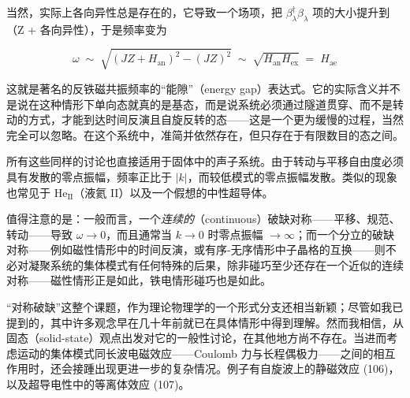 当然，实际上各向异性总是存在的，它导致一个场项，把 $\beta_\lambda^\dagger\beta_\lambda$ 项的大小提升到（Z + 各向异性），于是频率变为

\begin{equation*}
\omega \;\sim\; \sqrt{\left(JZ + H_{\text{an}}\right)^2 - \left(JZ\right)^2} \;\sim\; \sqrt{H_{\text{an}}H_{\text{ex}}} \;=\; H_{\text{ae}}
\end{equation*}

这就是著名的反铁磁共振频率的“能隙”（energy gap）表达式。它的实际含义并不是说在这种情形下单向态就真的是基态，而是说系统必须通过隧道贯穿、而不是转动的方式，才能到达时间反演且自旋反转的态——这是一个更为缓慢的过程，当然完全可以忽略。在这个系统中，准简并依然存在，但只存在于有限数目的态之间。

所有这些同样的讨论也直接适用于固体中的声子系统。由于转动与平移自由度必须具有发散的零点振幅，频率正比于 $|k|$，而较低模式的零点振幅发散。类似的现象也常见于 $\mathrm{He}_{\mathrm{II}}$（液氦 II）以及一个假想的中性超导体。

值得注意的是：一般而言，一个\emph{连续的}（continuous）破缺对称——平移、规范、转动——导致 $\omega\to 0$，而且通常当 $k\to 0$ 时零点振幅 $\to\infty$；而一个分立的破缺对称——例如磁性情形中的时间反演，或有序-无序情形中子晶格的互换——则不必对凝聚系统的集体模式有任何特殊的后果，除非碰巧至少还存在一个近似的连续对称——磁性情形正是如此，铁电情形碰巧也是如此。

“对称破缺”这整个课题，作为理论物理学的一个形式分支还相当新颖；尽管如我已提到的，其中许多观念早在几十年前就已在具体情形中得到理解。然而我相信，从固态（solid-state）观点出发对它的一般性讨论，在其他地方尚不存在。当进而考虑运动的集体模式同长波电磁效应——Coulomb 力与长程偶极力——之间的相互作用时，还会接踵出现更进一步的复杂情况。例子有自旋波上的静磁效应 (106)，以及超导电性中的等离体效应 (107)。

